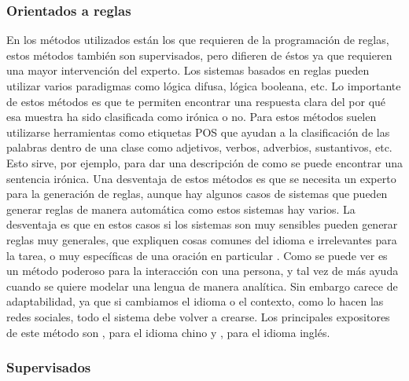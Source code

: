 \subsubsection{Orientados a reglas}
\par En los métodos utilizados están los que requieren de la programación de reglas, estos métodos también son supervisados, pero difieren de éstos ya que requieren una mayor intervención del experto. Los sistemas basados en reglas pueden utilizar varios paradigmas como lógica difusa, lógica booleana, etc. Lo importante de estos métodos es que te permiten encontrar una respuesta clara del por qué esa muestra ha sido clasificada como irónica o no. Para estos métodos suelen utilizarse herramientas como etiquetas \gls{POS} que ayudan a la clasificación de las palabras dentro de una clase como adjetivos, verbos, adverbios, sustantivos, etc. Esto sirve, por ejemplo, para dar una descripción de como se puede encontrar una sentencia irónica. Una desventaja de estos métodos es que se necesita un experto para la generación de reglas, aunque hay algunos casos de sistemas que pueden generar reglas de manera automática \cite{mitra1995fuzzy} como estos sistemas hay varios. La desventaja es que en estos casos si los sistemas son muy sensibles pueden generar reglas muy generales, que expliquen cosas comunes del idioma e irrelevantes para la tarea, o muy específicas de una oración en particular \cite{kotsiantis2007supervised}. Como se puede ver es un método poderoso para la interacción con una persona, y tal vez de más ayuda cuando se quiere modelar una lengua de manera analítica. Sin embargo carece de adaptabilidad, ya que si cambiamos el idioma o el contexto, como lo hacen las redes sociales, todo el sistema debe volver a crearse. Los principales expositores de este método son \cite{kong2011formalization}, para el idioma chino  y \cite{utsumi1995interpret}, para el idioma inglés.

\subsubsection{Supervisados}

